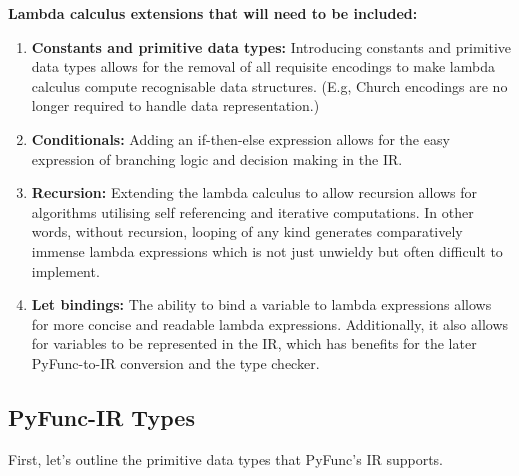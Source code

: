 \documentclass{l4proj}
\begin{document}
\textbf{Lambda calculus extensions that will need to be included:}
\begin{enumerate}
    \item \textbf{Constants and primitive data types:} Introducing constants and primitive data types allows for the removal of all requisite encodings to make lambda calculus compute recognisable data structures. (E.g, Church encodings are no longer required to handle data representation.)
    \item \textbf{Conditionals:} Adding an if-then-else expression allows for the easy expression of branching logic and decision making in the IR.
    \item \textbf{Recursion:} Extending the lambda calculus to allow recursion allows for algorithms utilising self referencing and iterative computations.
    In other words, without recursion, looping of any kind generates comparatively immense lambda expressions which is not just unwieldy but often difficult to implement.
    \item \textbf{Let bindings:} The ability to bind a variable to lambda expressions allows for more concise and readable lambda expressions.
    Additionally, it also allows for variables to be represented in the IR, which has benefits for the later PyFunc-to-IR conversion and the type checker. 
\end{enumerate}

\subsection{PyFunc-IR Types}

First, let's outline the primitive data types that PyFunc's IR supports.

\end{document}

